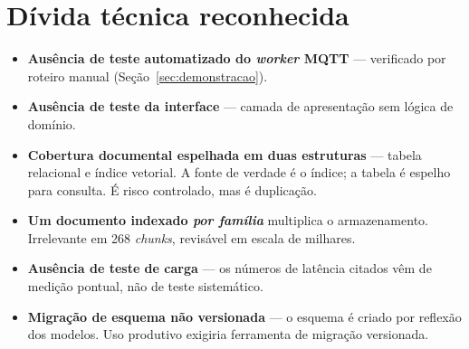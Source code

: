 \section{Dívida técnica reconhecida}

\begin{limitacao}
\begin{itemize}
  \item \textbf{Ausência de teste automatizado do \textit{worker} MQTT} ---
    verificado por roteiro manual (Seção~\ref{sec:demonstracao}).
  \item \textbf{Ausência de teste da interface} --- camada de apresentação sem
    lógica de domínio.
  \item \textbf{Cobertura documental espelhada em duas estruturas} --- tabela
    relacional e índice vetorial. A fonte de verdade é o índice; a tabela é
    espelho para consulta. É risco controlado, mas é duplicação.
  \item \textbf{Um documento indexado \emph{por família}} multiplica o
    armazenamento. Irrelevante em 268 \textit{chunks}, revisável em escala de
    milhares.
  \item \textbf{Ausência de teste de carga} --- os números de latência citados
    vêm de medição pontual, não de teste sistemático.
  \item \textbf{Migração de esquema não versionada} --- o esquema é criado por
    reflexão dos modelos. Uso produtivo exigiria ferramenta de migração
    versionada.
\end{itemize}
\end{limitacao}
